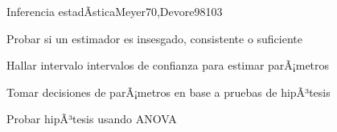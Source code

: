 \begin{syllabus}
\begin{unit}{Inferencia estadÃ­stica}{Meyer70,Devore98}{10}{3}
   \begin{learningoutcomes}
      \item Probar si un estimador es insesgado, consistente o suficiente
      \item Hallar intervalo intervalos de confianza para estimar parÃ¡metros
      \item Tomar decisiones de parÃ¡metros en base a pruebas de hipÃ³tesis
      \item Probar hipÃ³tesis usando ANOVA
   \end{learningoutcomes}
\end{unit}



\begin{coursebibliography}
\end{coursebibliography}

\end{syllabus}
